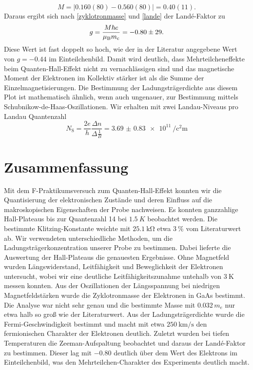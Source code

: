 \documentclass[paper=a4,fontsize=10pt,DIV=18,twocolumn,parskip=half]{scrartcl}
\numberwithin{equation}{section}    %
\begin{document}
\begin{equation}
M=|0.160(80)-0.560(80)|=0.40(11).
\end{equation}
Daraus ergibt sich nach \eqref{zyklotronmasse} und \eqref{lande} der Landé-Faktor zu
\begin{equation}
g=\frac{M \hbar e}{\mu_{\rm B} m_{\rm c}}=-0.80\pm29.
\end{equation}
Diese Wert ist fast doppelt so hoch, wie der in der Literatur \citep{anleitung} angegebene Wert von $g=-0.44$ im Einteilchenbild. Damit wird deutlich, dass Mehrteilcheneffekte beim Quanten-Hall-Effekt nicht zu vernachlässigen sind und das magnetische Moment der Elektronen im Kollektiv stärker ist als die Summe der Einzelmagnetisierungen.
Die Bestimmung der Ladungsträgerdichte aus diesem Plot ist mathematisch ähnlich, wenn auch ungenauer, zur Bestimmung mittels Schubnikow-de-Haas-Oszillationen.
Wir erhalten mit zwei Landau-Niveaus pro Landau Quantenzahl
\begin{equation}
N_\mathrm{S}=\frac{2e}{h}\frac{\Delta n}{\Delta \frac{1}{B}}=\SI{3.69(083)e11}{\per\square\centi\meter}
\end{equation}

\section{Zusammenfassung}
\label{Zusammenfassung}

Mit dem F-Praktikumsversuch zum Quanten-Hall-Effekt konnten wir die Quantisierung
der elektronischen Zustände und deren Einfluss auf die makroskopischen Eigenschaften 
der Probe nachweisen. Es konnten ganzzahlige Hall-Plateaus bis zur Quantenzahl 14 bei 
$\SI{1.5}{K}$ beobachtet werden. Die bestimmte Klitzing-Konstante weichte 
mit $\SI{25.1}{\kilo\ohm}$ etwa $\SI{3}{\percent}$ vom Literaturwert ab.
Wir verwendeten unterschiedliche Methoden, um die Ladungsträgerkonzentration unserer
Probe zu bestimmen. Dabei lieferte die Auswertung der Hall-Plateaus die genauesten 
Ergebnisse. Ohne Magnetfeld wurden Längswiderstand, Leitfähigkeit und Beweglichkeit 
der Elektronen untersucht, wobei wir eine deutliche Leitfähigkeitszunahme untehalb von 
$\SI{3}{\kelvin}$ messen konnten. Aus der Oszillationen der Längsspannung bei niedrigen 
Magnetfeldstärken wurde die Zyklotronmasse der Elektronen in GaAs bestimmt. Die 
Analyse war nicht sehr genau und die bestimmte Masse mit $0.032\,m_e$ nur etwa halb 
so groß wie der Literaturwert. Aus der Ladungsträgerdichte wurde die Fermi-Geschwindigkeit 
bestimmt und macht mit etwa $\SI[per-mode=symbol]{250}{\kilo\meter\per\second}$ den fermionischen Charakter
der Elektronen deutlich. Zuletzt wurden bei tiefen Temperaturen die Zeeman-Aufspaltung 
beobachtet und daraus der Landé-Faktor zu bestimmen. Dieser lag mit $-0.80$ deutlich über
dem Wert des Elektrons im Einteilchenbild, was den Mehrteilchen-Charakter des Experiments
deutlich macht.
\end{document}
